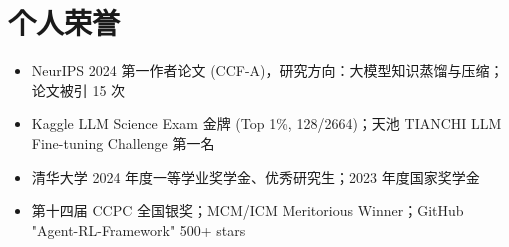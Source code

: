 \documentclass{resume-photo}
\begin{document}
\section{个人荣誉}
\begin{itemize}
  \item NeurIPS 2024 第一作者论文 (CCF-A)，研究方向：大模型知识蒸馏与压缩；论文被引 15 次
  \item Kaggle LLM Science Exam 金牌 (Top 1\%, 128/2664)；天池 TIANCHI LLM Fine-tuning Challenge 第一名
  \item 清华大学 2024 年度一等学业奖学金、优秀研究生；2023 年度国家奖学金
  \item 第十四届 CCPC 全国银奖；MCM/ICM Meritorious Winner；GitHub "Agent-RL-Framework" 500+ stars
\end{itemize}
\end{document}
